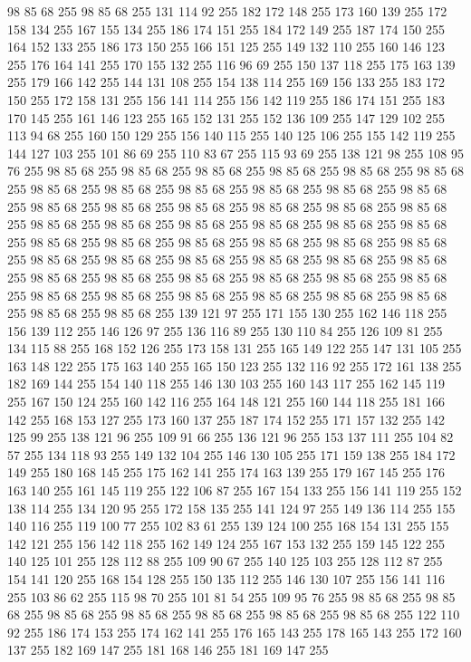98 85 68 255 98 85 68 255 131 114 92 255 182 172 148 255 173 160 139 255 172 158 134 255 167 155 134 255 186 174 151 255 184 172 149 255 187 174 150 255 164 152 133 255 186 173 150 255 166 151 125 255 149 132 110 255 160 146 123 255 176 164 141 255 170 155 132 255 116 96 69 255 150 137 118 255 175 163 139 255 179 166 142 255 144 131 108 255 154 138 114 255 169 156 133 255 183 172 150 255 172 158 131 255 156 141 114 255 156 142 119 255 186 174 151 255 183 170 145 255 161 146 123 255 165 152 131 255 152 136 109 255 147 129 102 255 113 94 68 255 160 150 129 255 156 140 115 255 140 125 106 255 155 142 119 255 144 127 103 255 101 86 69 255 110 83 67 255 115 93 69 255 138 121 98 255 108 95 76 255 98 85 68 255 98 85 68 255 98 85 68 255 98 85 68 255 98 85 68 255 98 85 68 255 98 85 68 255 98 85 68 255 98 85 68 255 98 85 68 255 98 85 68 255 98 85 68 255 98 85 68 255 98 85 68 255 98 85 68 255 98 85 68 255 98 85 68 255 98 85 68 255 98 85 68 255
98 85 68 255 98 85 68 255 98 85 68 255 98 85 68 255 98 85 68 255 98 85 68 255 98 85 68 255 98 85 68 255 98 85 68 255 98 85 68 255 98 85 68 255 98 85 68 255 98 85 68 255 98 85 68 255 98 85 68 255 98 85 68 255 98 85 68 255 98 85 68 255 98 85 68 255 98 85 68 255 98 85 68 255 98 85 68 255 98 85 68 255 98 85 68 255 98 85 68 255 98 85 68 255 98 85 68 255 98 85 68 255 98 85 68 255 98 85 68 255 98 85 68 255 139 121 97 255 171 155 130 255 162 146 118 255 156 139 112 255 146 126 97 255 136 116 89 255 130 110 84 255 126 109 81 255 134 115 88 255 168 152 126 255 173 158 131 255 165 149 122 255 147 131 105 255 163 148 122 255 175 163 140 255 165 150 123 255 132 116 92 255 172 161 138 255 182 169 144 255 154 140 118 255 146 130 103 255 160 143 117 255 162 145 119 255 167 150 124 255 160 142 116 255 164 148 121 255 160 144 118 255 181 166 142 255 168 153 127 255 173 160 137 255 187 174 152 255 171 157 132 255 142 125 99 255
138 121 96 255 109 91 66 255 136 121 96 255 153 137 111 255 104 82 57 255 134 118 93 255 149 132 104 255 146 130 105 255 171 159 138 255 184 172 149 255 180 168 145 255 175 162 141 255 174 163 139 255 179 167 145 255 176 163 140 255 161 145 119 255 122 106 87 255 167 154 133 255 156 141 119 255 152 138 114 255 134 120 95 255 172 158 135 255 141 124 97 255 149 136 114 255 155 140 116 255 119 100 77 255 102 83 61 255 139 124 100 255 168 154 131 255 155 142 121 255 156 142 118 255 162 149 124 255 167 153 132 255 159 145 122 255 140 125 101 255 128 112 88 255 109 90 67 255 140 125 103 255 128 112 87 255 154 141 120 255 168 154 128 255 150 135 112 255 146 130 107 255 156 141 116 255 103 86 62 255 115 98 70 255 101 81 54 255 109 95 76 255 98 85 68 255 98 85 68 255 98 85 68 255 98 85 68 255 98 85 68 255 98 85 68 255 98 85 68 255 122 110 92 255 186 174 153 255 174 162 141 255 176 165 143 255 178 165 143 255 172 160 137 255 182 169 147 255 181 168 146 255 181 169 147 255
